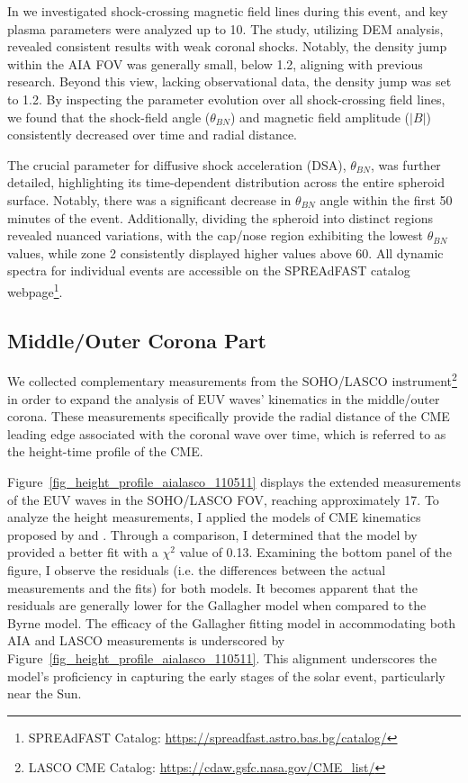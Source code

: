 In \citet{kozarev_2022} we investigated shock-crossing magnetic field lines during this event, and key plasma parameters were analyzed up to 10\rsun. The study, utilizing DEM analysis, revealed consistent results with weak coronal shocks. Notably, the density jump within the AIA FOV was generally small, below 1.2, aligning with previous research. Beyond this view, lacking observational data, the density jump was set to 1.2.
By inspecting the parameter evolution over all shock-crossing field lines, we found that the shock-field angle ($\theta_{BN}$) and magnetic field amplitude ($|B|$) consistently decreased over time and radial distance.

The crucial parameter for diffusive shock acceleration (DSA), $\theta_{BN}$, was further detailed, highlighting its time-dependent distribution across the entire spheroid surface. Notably, there was a significant decrease in $\theta_{BN}$ angle within the first 50 minutes of the event. Additionally, dividing the spheroid into distinct regions revealed nuanced variations, with the cap/nose region exhibiting the lowest $\theta_{BN}$ values, while zone 2 consistently displayed higher values above 60\degree. All dynamic spectra for individual events are accessible on the SPREAdFAST catalog webpage\footnote{SPREAdFAST Catalog: \url{https://spreadfast.astro.bas.bg/catalog/}}.

\subsection{Middle/Outer Corona Part}
We collected complementary measurements from the SOHO/LASCO instrument\footnote{LASCO CME Catalog: \url{https://cdaw.gsfc.nasa.gov/CME_list/}} in order to expand the analysis of EUV waves' kinematics in the middle/outer corona. These measurements specifically provide the radial distance of the CME leading edge associated with the coronal wave over time, which is referred to as the height-time profile of the CME.

Figure~\ref{fig_height_profile_aialasco_110511} displays the extended measurements of the EUV waves in the SOHO/LASCO FOV, reaching approximately 17\rsun. To analyze the height measurements, I applied the models of CME kinematics proposed by \citet{gallagher_2003} and \citet{byrne_2013}. Through a comparison, I determined that the model by \citet{gallagher_2003} provided a better fit with a $\chi^2$ value of 0.13. Examining the bottom panel of the figure, I observe the residuals (i.e. the differences between the actual measurements and the fits) for both models. It becomes apparent that the residuals are generally lower for the Gallagher model when compared to the Byrne model.
The efficacy of the Gallagher fitting model in accommodating both AIA and LASCO measurements is underscored by Figure~\ref{fig_height_profile_aialasco_110511}. This alignment underscores the model's proficiency in capturing the early stages of the solar event, particularly near the Sun.

